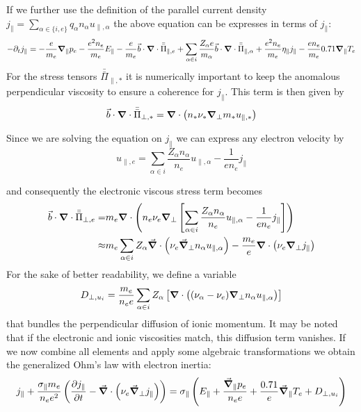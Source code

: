 If we further use the definition of the parallel current density $
j_\parallel = \sum_{\alpha \in \{i,e\}} q_\alpha n_\alpha u_{\parallel,\alpha} $ the above equation can be expresses in terms of $j_\parallel$:
$$
-\partial_tj_\parallel = -\frac{e}{m_e}\grad_\parallel p_e - \frac{e^2n_e}{m_e}E_\parallel - \frac{e}{m_e}\vec{b}\cdot\grad\cdot\bar{\bar{\Pi}}_{\parallel,e}  + \sum_{\alpha \in i}\frac{Z_\alpha e}{m_\alpha} \vec{b}\cdot\grad\cdot\bar{\bar{\Pi}}_{\parallel,\alpha} + \frac{e^2n_e}{m_e}\eta_\parallel j_\parallel - \frac{en_e}{m_e}0.71\grad_\parallel T_e
$$
For the stress tensors $\bar{\bar{\Pi}}_{\parallel,*}$ it is numerically important to keep the anomalous perpendicular viscosity to ensure a coherence for $j_\parallel$. This term is then given by
$$
\vec{b}\cdot\grad\cdot\bar{\bar{\Pi}}_{\perp,*} = \grad\cdot\left(n_*\nu_*\grad_\perp m_*u_{\parallel,*}\right)
$$

Since we are solving the equation on $j_\parallel$ we can express any electron velocity by
$$
u_{\parallel,e} = \sum_{\alpha \in i}\frac{Z_\alpha n_\alpha}{n_e} u_{\parallel,\alpha} - \frac{1}{en_e}j_\parallel
$$

and consequently the electronic viscous stress term becomes
\begin{align*}
	\vec{b}\cdot\grad\cdot\bar{\bar{\Pi}}_{\perp,e} =& m_e\grad\cdot\left(n_e\nu_e\grad_\perp\left[\sum_{\alpha \in i}\frac{Z_\alpha n_\alpha}{n_e} u_{\parallel,\alpha} - \frac{1}{en_e}j_\parallel \right]\right) \\
	\approx& m_e\sum_{\alpha \in i}Z_\alpha\vec{\grad}\cdot\left(\nu_e\vec{\grad}_\perp n_\alpha u_{\parallel,\alpha}\right) - \frac{m_e}{e}\grad\cdot\left(\nu_e\grad_\perp j_\parallel\right)
\end{align*}
For the sake of better readability, we define a variable 
$$
D_{\perp,u_i} = \frac{m_e}{n_ee}\sum_{\alpha \in i}Z_\alpha\left[\grad\cdot\left((\nu_\alpha - \nu_e)\grad_\perp n_\alpha u_{\parallel,\alpha}\right)\right]
$$ 
that bundles the perpendicular diffusion of ionic momentum. It may be noted that if the electronic and ionic viscosities match, this diffusion term vanishes. If we now combine all elements and apply some algebraic transformations we obtain the generalized Ohm's law with electron inertia: 
\begin{equation}
	\label{eq:OhmLaw_with_electronInertia}
	j_\parallel + \frac{\sigma_\parallel m_e}{n_ee^2} \left(\pdv{j_\parallel}{t} - \vec{\grad}\cdot\left(\nu_e\vec{\grad}_\perp j_\parallel\right)\right) = \sigma_\parallel \left(E_\parallel + \frac{\vec{\grad}_\parallel p_e}{n_ee} + \frac{0.71}{e}\vec{\grad}_\parallel T_e + D_{\perp,u_i}\right)
\end{equation}

